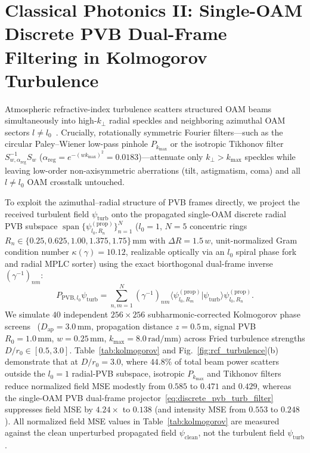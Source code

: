 \documentclass[aps,pra,onecolumn,notitlepage,11pt,tightenlines,nofootinbib,floatfix,longbibliography]{revtex4-2}
\newcommand{\braket}[2]{\langle #1 | #2 \rangle}
\begin{document}
\section{Classical Photonics II: Single-OAM Discrete PVB Dual-Frame Filtering in Kolmogorov Turbulence}
\label{sec:turbulence}

Atmospheric refractive-index turbulence scatters structured OAM beams simultaneously into high-$k_\perp$ radial speckles and neighboring azimuthal OAM sectors $l \neq l_0$~\cite{Paterson2005,TylerBoyd2009,AndrewsPhillips2005}. Crucially, rotationally symmetric Fourier filters---such as the circular Paley--Wiener low-pass pinhole $P_{k_{\max}}$ or the isotropic Tikhonov filter $S_{w,\alpha_{\mathrm{reg}}}^{-1}S_w$ ($\alpha_{\mathrm{reg}} = e^{-(w k_{\max})^2} = 0.0183$)---attenuate only $k_\perp > k_{\max}$ speckles while leaving low-order non-axisymmetric aberrations (tilt, astigmatism, coma) and all $l \neq l_0$ OAM crosstalk untouched.

To exploit the azimuthal--radial structure of PVB frames directly, we project the received turbulent field $\psi_{\mathrm{turb}}$ onto the propagated single-OAM discrete radial PVB subspace $\operatorname{span}\{\psi_{l_0,R_n}^{(\mathrm{prop})}\}_{n=1}^N$ ($l_0 = 1$, $N = 5$ concentric rings $R_n \in \{0.25, 0.625, 1.00, 1.375, 1.75\}\,\mathrm{mm}$ with $\Delta R = 1.5\,w$, unit-normalized Gram condition number $\kappa(\gamma) = 10.12$, realizable optically via an $l_0$ spiral phase fork and radial MPLC sorter) using the exact biorthogonal dual-frame inverse $(\gamma^{-1})_{nm}$:
\begin{equation}
P_{\mathrm{PVB},l_0}\psi_{\mathrm{turb}} = \sum_{n,m=1}^N (\gamma^{-1})_{nm}\braket{\psi_{l_0,R_m}^{(\mathrm{prop})}}{\psi_{\mathrm{turb}}}\psi_{l_0,R_n}^{(\mathrm{prop})}.
\label{eq:discrete_pvb_turb_filter}
\end{equation}
We simulate $40$ independent $256\times 256$ subharmonic-corrected Kolmogorov phase screens~\cite{Lane1992} ($D_{\mathrm{ap}} = 3.0\,\mathrm{mm}$, propagation distance $z = 0.5\,\mathrm{m}$, signal PVB $R_0 = 1.0\,\mathrm{mm}$, $w = 0.25\,\mathrm{mm}$, $k_{\max} = 8.0\,\mathrm{rad/mm}$) across Fried turbulence strengths $D/r_0 \in [0.5, 3.0]$. Table~\ref{tab:kolmogorov} and Fig.~\ref{fig:rcf_turbulence}(b) demonstrate that at $D/r_0 = 3.0$, where $44.8\%$ of total beam power scatters outside the $l_0 = 1$ radial-PVB subspace, isotropic $P_{k_{\max}}$ and Tikhonov filters reduce normalized field MSE modestly from $0.585$ to $0.471$ and $0.429$, whereas the single-OAM PVB dual-frame projector~\eqref{eq:discrete_pvb_turb_filter} suppresses field MSE by $4.24\times$ to $0.138$ (and intensity MSE from $0.553$ to $0.248$). All normalized field MSE values in Table~\ref{tab:kolmogorov} are measured against the clean unperturbed propagated field $\psi_{\mathrm{clean}}$, not the turbulent field $\psi_{\mathrm{turb}}$.
\end{document}
